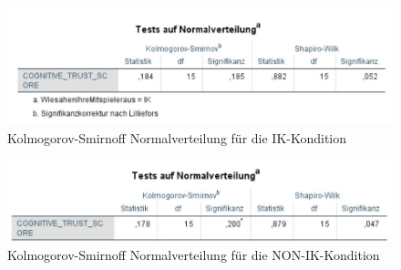 \documentclass[a4paper,11pt]{article}%
\renewcommand{\\}{\vspace*{0.5\baselineskip} \newline}
\begin{document}
	\begin{figure}[H]
	\centering
		\begin{footnotesize}
			\includegraphics[scale=0.6]{Abbildungen/Post_QuestionnaireStatistiks/Normalverteilung_15_IK}
			
			\caption{Kolmogorov-Smirnoff Normalverteilung für die IK-Kondition}
			\label{fig:KolSmirIndIK}
		\end{footnotesize}
	\end{figure}	
	
	\begin{figure}[H]
	\centering
		\begin{footnotesize}
			\includegraphics[scale=0.6]{Abbildungen/Post_QuestionnaireStatistiks/Normalverteilung_15_NON_IK}\\
			\caption{Kolmogorov-Smirnoff Normalverteilung für die NON-IK-Kondition}
			\label{fig:KolSmirIndNONIK}
		\end{footnotesize}
	\end{figure}	
	
	
\end{document}
